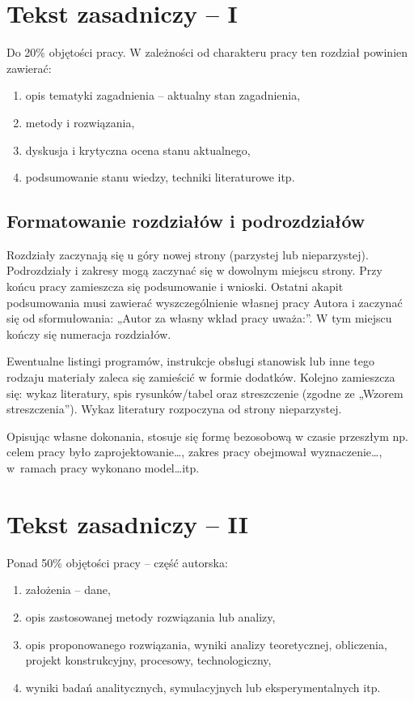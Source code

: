 \documentclass[12pt,twoside]{article}
\begin{document}
\clearpage

\section{Tekst zasadniczy -- I}

Do 20\% objętości pracy. W zależności od charakteru pracy ten rozdział powinien zawierać:
\begin{enumerate}[label=\alph*), leftmargin=1.25cm]
	\item opis tematyki zagadnienia -- aktualny stan zagadnienia,
	\item metody i rozwiązania,
	\item dyskusja i krytyczna ocena stanu aktualnego,
	\item podsumowanie stanu wiedzy, techniki literaturowe itp.
\end{enumerate}

\subsection{Formatowanie rozdziałów i podrozdziałów}
Rozdziały zaczynają się u góry nowej strony (parzystej lub nieparzystej). Podrozdziały i zakresy mogą zaczynać się w dowolnym miejscu strony. Przy końcu pracy zamieszcza się podsumowanie i wnioski. Ostatni akapit podsumowania musi zawierać wyszczególnienie własnej pracy Autora i zaczynać się od sformułowania: „Autor za własny wkład pracy uważa:”. W tym miejscu kończy się numeracja rozdziałów.

Ewentualne listingi programów, instrukcje obsługi stanowisk lub inne tego rodzaju materiały zaleca się zamieścić w formie dodatków. Kolejno zamieszcza się: wykaz literatury, spis rysunków/tabel oraz streszczenie (zgodne ze „Wzorem streszczenia”). Wykaz literatury rozpoczyna od strony nieparzystej.

Opisując własne dokonania, stosuje się formę bezosobową w czasie przeszłym np. celem pracy było zaprojektowanie\ldots, zakres pracy obejmował wyznaczenie\ldots, w~ramach pracy wykonano model\ldots itp.
\clearpage

\section{Tekst zasadniczy -- II}

Ponad 50\% objętości pracy -- część autorska:
\begin{enumerate}[label=\alph*), leftmargin=1.25cm]
	\item założenia – dane,
	\item opis zastosowanej metody rozwiązania lub analizy,
	\item opis proponowanego rozwiązania, wyniki analizy teoretycznej, obliczenia, projekt konstrukcyjny, procesowy, technologiczny,
	\item wyniki badań analitycznych, symulacyjnych lub eksperymentalnych itp.
\end{enumerate}
\end{document}
